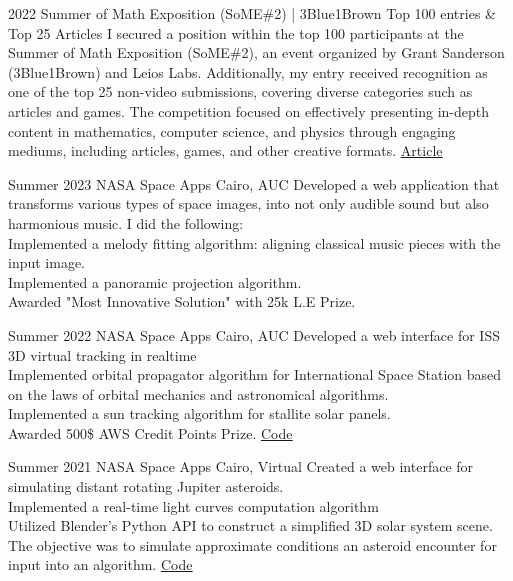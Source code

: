 \documentclass[hidelinks]{report}
\begin{document}
\entry
    {2022}
    {Summer of Math Exposition (SoME\#2) | 3Blue1Brown}  
    {Top 100 entries \& Top 25 Articles}
    {
        I secured a position within the top 100 participants at the Summer of Math Exposition (SoME\#2), an event organized by Grant Sanderson (3Blue1Brown) and Leios Labs. Additionally, my entry received recognition as one of the top 25 non-video submissions, covering diverse categories such as articles and games. The competition focused on effectively presenting in-depth content in mathematics, computer science, and physics through engaging mediums, including articles, games, and other creative formats. \href{\blog/diffusion}{\underline{Article}}
    }

\vspace{2mm}
\newpage
{}

\entry 
    {Summer 2023}
    {NASA Space Apps Cairo, \normalfont AUC }
    {}
    { Developed a web application that transforms various types of space images, into not only audible sound but also harmonious music. I did the following:\\
      \textbullet Implemented a melody fitting algorithm: aligning classical music pieces with the input image.\\
      \textbullet Implemented a  panoramic projection algorithm.\\
      \textbullet Awarded "Most Innovative Solution" with 25k L.E Prize.
    }
    
\entry 
    {Summer 2022}
    {NASA Space Apps Cairo, \normalfont AUC }
    {}
    { \textbullet Developed a web interface for ISS 3D virtual tracking in realtime \\
      \textbullet Implemented orbital propagator algorithm for International Space Station based on
      the laws of orbital mechanics and astronomical algorithms. \\ 
      \textbullet Implemented a sun tracking algorithm for stallite solar panels.\\
      \textbullet Awarded 500\$ AWS Credit Points Prize. \href{\github/Apollo}{\underline{Code}}
    }


\entry
    {Summer 2021}
    {NASA Space Apps Cairo, \normalfont Virtual} 
    {}
    {
      \textbullet Created a web interface for simulating distant rotating Jupiter asteroids.\\
      \textbullet Implemented a real-time light curves computation algorithm \\
      \textbullet Utilized Blender's Python API to construct a simplified 3D solar system scene. The objective was to simulate approximate conditions an asteroid encounter for input into an algorithm.
      \href{\github/Asteroid-Bent}{\underline{Code}}
    }
\end{document}
